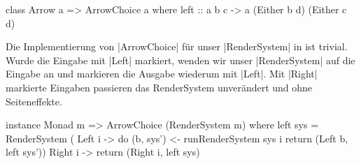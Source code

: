 
\begin{haskell}[label={lst:class-arrowchoice},caption={ArrowChoice Klasse\protect\footnotemark},nolol,float,floatplacement=H]
class Arrow a => ArrowChoice a where
  left :: a b c -> a (Either b d) (Either c d)
\end{haskell}

Die Implementierung von |ArrowChoice| für unser |RenderSystem| in  ist trivial. Wurde die Eingabe mit |Left| markiert, wenden wir unser |RenderSystem| auf die Eingabe an und markieren die Ausgabe wiederum mit |Left|. Mit |Right| markierte Eingaben passieren das RenderSystem unverändert und ohne Seiteneffekte.

\begin{haskell}[label={lst:rendersystem-arrowchoice},caption={ArrowChoice Instanz für RenderSystem}]
instance Monad m => ArrowChoice (RenderSystem m) where
  left sys = RenderSystem (\case
    Left i  -> do
      (b, sys') <- runRenderSystem sys i
      return (Left b, left sys'))
    Right i -> return (Right i, left sys)
\end{haskell}
